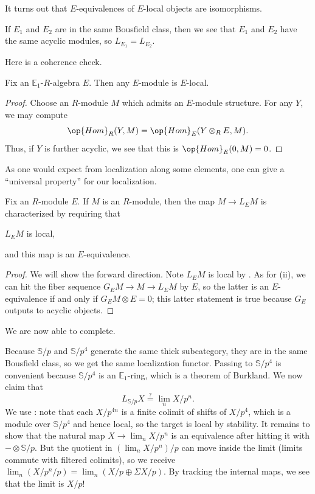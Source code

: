 \documentclass[../notes.tex]{subfiles}
\begin{document}
\begin{remark}
	It turns out that $E$-equivalences of $E$-local objects are isomorphisms.
\end{remark}
\begin{remark}
	If $E_1$ and $E_2$ are in the same Bousfield class, then we see that $E_1$ and $E_2$ have the same acyclic modules, so $L_{E_1}=L_{E_2}$.
\end{remark}
Here is a coherence check.
\begin{lemma}
	Fix an $\mathbb E_1$-$R$-algebra $E$. Then any $E$-module is $E$-local.
\end{lemma}
\begin{proof}
	Choose an $R$-module $M$ which admits an $E$-module structure. For any $Y$, we may compute
	\[\op{Hom}_R(Y,M)=\op{Hom}_E(Y\otimes_RE,M).\]
	Thus, if $Y$ is further acyclic, we see that this is $\op{Hom}_E(0,M)=0$.
\end{proof}
As one would expect from localization along some elements, one can give a ``universal property'' for our localization.
\begin{lemma} \label{lem:get-localization}
	Fix an $R$-module $E$. If $M$ is an $R$-module, then the map $M\to L_EM$ is characterized by requiring that
	\begin{listroman}
		\item $L_EM$ is local,
		\item and this map is an $E$-equivalence.
	\end{listroman}
\end{lemma}
\begin{proof}
	We will show the forward direction. Note $L_EM$ is local by . As for (ii), we can hit the fiber sequence $G_EM\to M\to L_EM$ by $E$, so the latter is an $E$-equivalence if and only if $G_EM\otimes E=0$; this latter statement is true because $G_E$ outputs to acyclic objects.
\end{proof}
We are now able to complete.
\begin{example}
	Because $\mathbb S/p$ and $\mathbb S/p^4$ generate the same thick subcategory, they are in the same Bousfield class, so we get the same localization functor. Passing to $\mathbb S/p^4$ is convenient because $\mathbb S/p^4$ is an $\mathbb E_1$-ring, which is a theorem of Burkland. We now claim that
	\[L_{\mathbb S/p}X\stackrel?=\lim_nX/p^n.\]
	We use : note that each $X/p^{4n}$ is a finite colimit of shifts of $X/p^4$, which is a module over $\mathbb S/p^4$ and hence local, so the target is local by stability. It remains to show that the natural map $X\to\lim_nX/p^n$ is an equivalence after hitting it with $-\otimes\mathbb S/p$. But the quotient in $(\lim_nX/p^n)/p$ can move inside the limit (limits commute with filtered colimits), so we receive $\lim_n(X/p^n/p)=\lim_n(X/p\oplus\Sigma X/p)$. By tracking the internal maps, we see that the limit is $X/p$!
\end{example}
\end{document}
